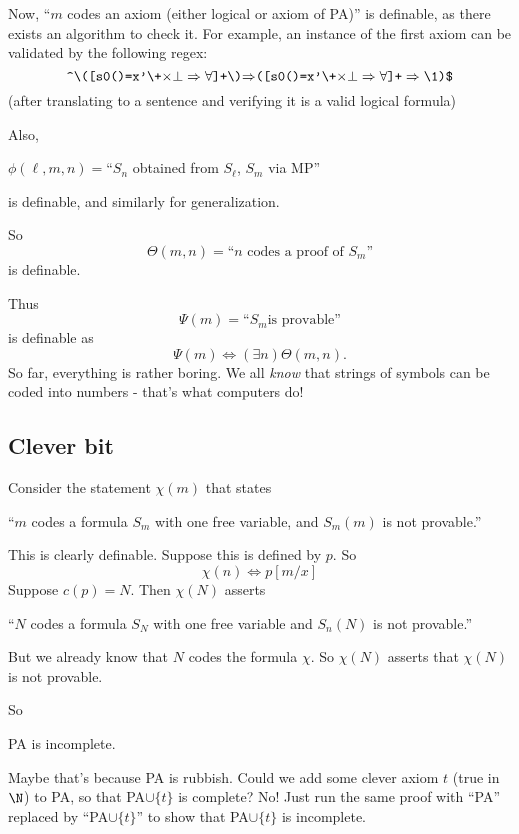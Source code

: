 \documentclass[a4paper]{article}
\begin{document}
Now, ``$m$ codes an axiom (either logical or axiom of PA)'' is definable, as there exists an algorithm to check it.  For example, an instance of the first axiom can be validated by the following regex:
\[
  \verb/^\([s0()=x'\+/\mathtt{\times\bot\Rightarrow\forall}\verb/]+\)/\mathtt{\Rightarrow}\verb/([s0()=x'\+/\mathtt{\times\bot\Rightarrow\forall}\verb/]+/\Rightarrow\verb/\1)$/
\]
(after translating to a sentence and verifying it is a valid logical formula)

Also, 
\begin{center}
  $\phi(\ell, m, n) = $``$S_n$ obtained from $S_\ell$, $S_m$ via MP''
\end{center}
is definable, and similarly for generalization.

So 
\[
  \Theta(m, n) =\text{``}n\text{ codes a proof of }S_m\text{''}
\]
is definable.

Thus
\[
  \Psi(m) = \text{``}S_m\text{is provable''}
\]
is definable as
\[
  \Psi(m) \Leftrightarrow (\exists n)\Theta(m, n).
\]
So far, everything is rather boring. We all \emph{know} that strings of symbols can be coded into numbers - that's what computers do!

\subsection*{Clever bit}
Consider the statement $\chi(m)$ that states
\begin{center}
  ``$m$ codes a formula $S_m$ with one free variable, and $S_m(m)$ is not provable.''
\end{center}


This is clearly definable. Suppose this is defined by $p$. So
\[
  \chi(n) \Leftrightarrow p[m/x]
\]
Suppose $c(p) = N$. Then $\chi(N)$ asserts 
\begin{center}
  ``$N$ codes a formula $S_N$ with one free variable and $S_n(N)$ is not provable.''
\end{center}

But we already know that $N$ codes the formula $\chi$. So $\chi(N)$ asserts that $\chi(N)$ is not provable.

So
\begin{thm}
  PA is incomplete.
\end{thm}

Maybe that's because PA is rubbish. Could we add some clever axiom $t$ (true in $\N$) to PA, so that PA$\cup \{t\}$ is complete? No! Just run the same proof with ``PA'' replaced by ``PA$\cup \{t\}$'' to show that PA$\cup\{t\}$ is incomplete.
\end{document}
